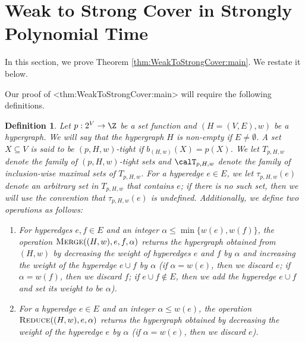 \documentclass{article}
\def\Cref#1{<#1>}%
\newtheorem{definition}{Definition}[section]
\newcommand{\maximalTightSetFamily}[1]{\ensuremath{\calT_{#1}}\xspace}
\newcommand{\tightSetFamily}[1]{\ensuremath{T_{#1}}\xspace}
\newcommand{\shubhang}[1]{{\color{blue}[{\tiny Shubhang: \bf #1}]\marginpar{\color{blue}*}}}
\newcommand{\knote}[1]{{\color{red}[{\tiny Karthik: \bf #1}]\marginpar{\color{red}*}}}
\newcommand{\maximalTightSetContainingHyperedge}[1]{\ensuremath{\tau_{#1}}\xspace}
\newcommand{\merge}{\ensuremath{\textsc{Merge}}\xspace}
\newcommand{\reduce}{\ensuremath{\textsc{Reduce}}\xspace}
\begin{document}
\section{Weak to Strong Cover in Strongly Polynomial Time}\label{sec:WeakToStrongCover}
In this section, we 
prove Theorem \ref{thm:WeakToStrongCover:main}. We restate it below. 
\thmWeakToStrongCover*

Our proof of \Cref{thm:WeakToStrongCover:main} will require the following definitions. 
\begin{definition}\label{def:(pHw)-tight-sets}
    Let $p:2^V\rightarrow\Z$ be a set function and $(H=(V,E), w)$ be a hypergraph. We will say that the hypergraph $H$ is \emph{non-empty} if $E\neq \emptyset$. 
    A set $X \subseteq V$ is said to be \emph{$(p, H, w)$-tight} if $b_{(H,w)}(X)=p(X)$. We let $\tightSetFamily{p,H,w}$ denote the family of $(p, H, w)$-tight sets and $\maximalTightSetFamily{p, H, w}$  denote the family of \emph{inclusion-wise maximal} sets of $\tightSetFamily{p,H,w}$. 
    For a hyperedge $e\in E$, we let $\maximalTightSetContainingHyperedge{p, H, w}(e)$ denote an arbitrary set in $\tightSetFamily{p, H, w}$ that contains $e$; if there is no such set, then we will use the convention that $\maximalTightSetContainingHyperedge{p, H, w}(e)$ is undefined.  
    Additionally, we define two operations as follows:
    \begin{enumerate}
        \item For hyperedges $e, f\in E$ and an integer  $\alpha\le \min\{w(e), w(f)\}$, the operation $\merge((H, w), e, f, \alpha)$ returns the hypergraph obtained from $(H, w)$ by decreasing the weight of hyperedges $e$ and $f$ by $\alpha$ and increasing the weight of the hyperedge $e\cup f$ by $\alpha$ (if $\alpha=w(e)$, then we discard $e$; if $\alpha=w(f)$, then we discard $f$; if $e\cup f\not\in E$, then we add the hyperedge $e\cup f$ and set its weight to be $\alpha$). 
        \item For a hyperedge $e\in E$ and an integer $\alpha \le w(e)$, the operation $\reduce((H, w), e, \alpha)$ returns the hypergraph obtained by decreasing the weight of the hyperedge $e$ by $\alpha$ (if $\alpha=w(e)$, then we discard $e$). 
    \end{enumerate}
\end{definition}
\end{document}
